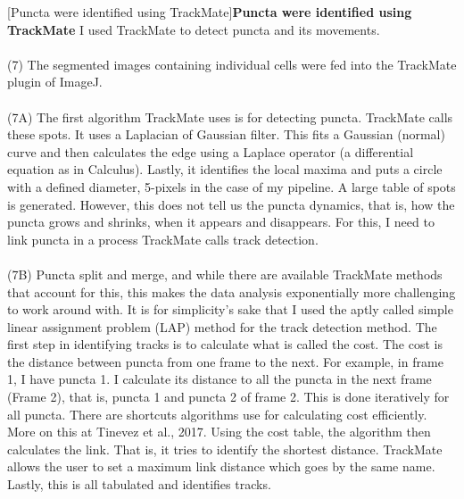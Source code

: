 \begin{centering}
[Puncta were identified using TrackMate]{\textbf{Puncta were identified using TrackMate} I used TrackMate to detect puncta and its movements.
\\
\\
(7) The segmented images containing individual cells were fed into the TrackMate plugin of ImageJ.
\\
\\
(7A) The first algorithm TrackMate uses is for detecting puncta. TrackMate calls these spots. It uses a Laplacian of Gaussian filter. This fits a Gaussian (normal) curve and then calculates the edge using a Laplace operator (a differential equation as in Calculus). Lastly, it identifies the local maxima and puts a circle with a defined diameter, 5-pixels in the case of my pipeline. A large table of spots is generated. However, this does not tell us the puncta dynamics, that is, how the puncta grows and shrinks, when it appears and disappears. For this, I need to link puncta in a process TrackMate calls track detection.
\\
\\
(7B) Puncta split and merge, and while there are available TrackMate methods that account for this, this makes the data analysis exponentially more challenging to work around with. It is for simplicity's sake that I used the aptly called simple linear assignment problem (LAP) method for the track detection method. The first step in identifying tracks is to calculate what is called the cost. The cost is the distance between puncta from one frame to the next. For example, in frame 1, I have puncta 1. I calculate its distance to all the puncta in the next frame (Frame 2), that is, puncta 1 and puncta 2 of frame 2. This is done iteratively for all puncta. There are shortcuts algorithms use for calculating cost efficiently. More on this at Tinevez et al., 2017. Using the cost table, the algorithm then calculates the link. That is, it tries to identify the shortest distance. TrackMate allows the user to set a maximum link distance which goes by the same name. Lastly, this is all tabulated and identifies tracks.
}
\end{centering}
